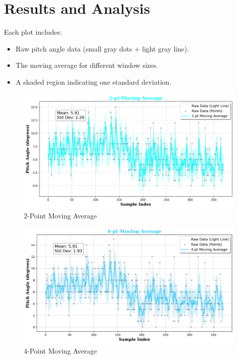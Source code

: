 \documentclass[a4paper,12pt]{article}
\begin{document}
\section*{Results and Analysis}
Each plot includes:
\begin{itemize}
    \item Raw pitch angle data (small gray dots + light gray line).
    \item The moving average for different window sizes.
    \item A shaded region indicating one standard deviation.
\end{itemize}

\begin{figure}[H]
    \centering
    \includegraphics[width=1\textwidth]{pitch_analysis_2pt.png}
    \caption{2-Point Moving Average}
    \label{fig:2pt}
\end{figure}
\begin{figure}[H]
    \centering
    \includegraphics[width=1\linewidth]{pitch_analysis_4pt.png}
    \caption{4-Point Moving Average}
    \label{fig:enter-label}
\end{figure}
\end{document}

